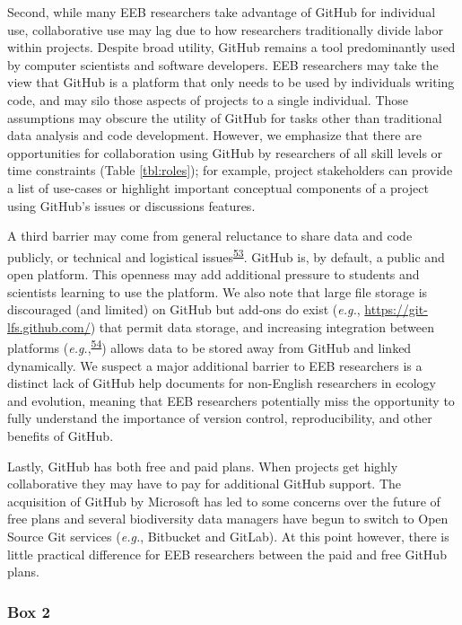 Second, while many EEB researchers take advantage of GitHub for individual use, collaborative use may lag due to how researchers traditionally divide labor within projects.
Despite broad utility, GitHub remains a tool predominantly used by computer scientists and software developers.
EEB researchers may take the view that GitHub is a platform that only needs to be used by individuals writing code, and may silo those aspects of projects to a single individual.
Those assumptions may obscure the utility of GitHub for tasks other than traditional data analysis and code development.
However, we emphasize that there are opportunities for collaboration using GitHub by researchers of all skill levels or time constraints (Table \ref{tbl:roles}); for example, project stakeholders can provide a list of use-cases or highlight important conceptual components of a project using GitHub's issues or discussions features.

A third barrier may come from general reluctance to share data and code publicly, or technical and logistical issues\textsuperscript{\protect\hyperlink{ref-pq2Tv1BC}{53}}.
GitHub is, by default, a public and open platform.
This openness may add additional pressure to students and scientists learning to use the platform.
We also note that large file storage is discouraged (and limited) on GitHub but add-ons do exist (\emph{e.g.}, \url{https://git-lfs.github.com/}) that permit data storage, and increasing integration between platforms (\emph{e.g.},\textsuperscript{\protect\hyperlink{ref-lx49NGto}{54}}) allows data to be stored away from GitHub and linked dynamically.
We suspect a major additional barrier to EEB researchers is a distinct lack of GitHub help documents for non-English researchers in ecology and evolution, meaning that EEB researchers potentially miss the opportunity to fully understand the importance of version control, reproducibility, and other benefits of GitHub.

Lastly, GitHub has both free and paid plans.
When projects get highly collaborative they may have to pay for additional GitHub support.
The acquisition of GitHub by Microsoft has led to some concerns over the future of free plans and several biodiversity data managers have begun to switch to Open Source Git services (\emph{e.g.}, Bitbucket and GitLab).
At this point however, there is little practical difference for EEB researchers between the paid and free GitHub plans.

\hypertarget{tips}{%
\subsubsection{Box 2}\label{tips}}

